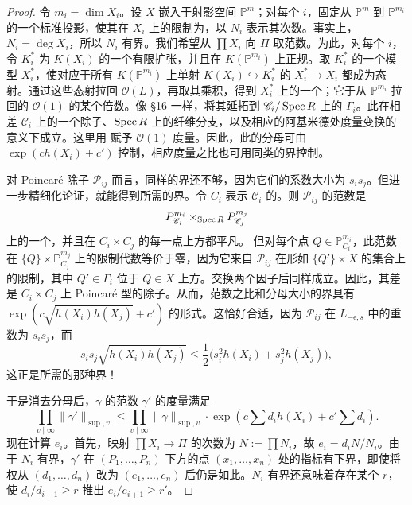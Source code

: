 \begin{proof}
令 $m_i=\dim X_i$。设 $X$ 嵌入于射影空间 $\mathbb P^m$；对每个 $i$，固定从 $\mathbb P^m$ 到 $\mathbb P^{m_i}$ 的一个标准投影，使其在 $X_i$ 上的限制为，以 $N_i$ 表示其次数。事实上，$N_i=\deg X_i$，所以 $N_i$ 有界。我们希望从 $\prod X_i$ 向 $\Pi$ 取范数。为此，对每个 $i$，令 $K_i^*$ 为 $K(X_i)$ 的一个有限扩张，并且在 $K(\mathbb P^{m_i})$ 上正规。取 $K_i^*$ 的一个模型 $X_i^*$，使对应于所有 $K(\mathbb P^{m_i})$ 上单射 $K(X_i)\hookrightarrow K_i^*$ 的 $X_i^*\to X_i$ 都成为态射。通过这些态射拉回 $\mathcal O(L)$，再取其乘积，得到 $X_i^*$ 上的一个；它于从 $\mathbb P^{m_i}$ 拉回的 $\mathcal O(1)$ 的某个倍数。像 §16 一样，将其延拓到 $\mathscr C_i/\operatorname{Spec} R$ 上的  $\Gamma_i$。此在相差 $\mathscr C_i$ 上的一个除子、$\operatorname{Spec} R$ 上的纤维分支，以及相应的阿基米德处度量变换的意义下成立。这里用 赋予 $\mathcal O(1)$ 度量。因此，此的分母可由 $\exp(ch(X_i)+c')$ 控制，相应度量之比也可用同类的界控制。

对 Poincaré 除子 $\mathscr P_{ij}$ 而言，同样的界还不够，因为它们的系数大小为 $s_is_j$。但进一步精细化论证，就能得到所需的界。令 $C_i$ 表示 $\mathscr C_i$ 的。则 $\mathscr P_{ij}$ 的范数是
\[
P^{m_i}_{\mathscr C_i}\times_{\operatorname{Spec} R}P^{m_j}_{\mathscr C_j}
\]
上的一个，并且在 $C_i\times C_j$ 的每一点上方都平凡。
但对每个点 $Q\in\mathbb P^{m_i}_{C_i}$，此范数在 $\{Q\}\times\mathbb P^{m_j}_{C_j}$ 上的限制代数等价于零，因为它来自 $\mathscr P_{ij}$ 在形如 $\{Q'\}\times X$ 的集合上的限制，其中 $Q'\in\Gamma_i$ 位于 $Q\in X$ 上方。交换两个因子后同样成立。因此，其差是 $C_i\times C_j$ 上 Poincaré 型的除子。从而，范数之比和分母大小的界具有 $\exp(c\sqrt{h(X_i)h(X_j)}+c')$ 的形式。这恰好合适，因为 $\mathscr P_{ij}$ 在 $L_{-\epsilon,s}$ 中的重数为 $s_is_j$，而
\[
s_is_j\sqrt{h(X_i)h(X_j)}\le\frac12\bigl(s_i^2h(X_i)+s_j^2h(X_j)\bigr),
\]
这正是所需的那种界！

于是消去分母后，$\gamma$ 的范数 $\gamma'$ 的度量满足
\begin{equation*}\tag{18.5}
\prod_{v\mid\infty}\|\gamma'\|_{\sup,v}
\le\prod_{v\mid\infty}\|\gamma\|_{\sup,v}
\cdot\exp\!\left(c\sum d_i h(X_i)+c'\sum d_i\right).
\end{equation*}
现在计算 $e_i$。首先，映射 $\prod X_i\to\Pi$ 的次数为 $N:=\prod N_i$，故 $e_i=d_iN/N_i$。由于 $N_i$ 有界，$\gamma'$ 在 $(P_1,\ldots,P_n)$ 下方的点 $(x_1,\ldots,x_n)$ 处的指标有下界，即使将权从 $(d_1,\ldots,d_n)$ 改为 $(e_1,\ldots,e_n)$ 后仍是如此。$N_i$ 有界还意味着存在某个 $r$，使 $d_i/d_{i+1}\ge r$ 推出 $e_i/e_{i+1}\ge r'$。


\end{proof}
